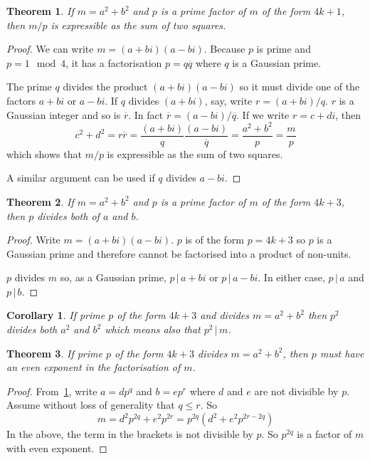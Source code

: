 \documentclass[11pt]{amsart}
\newtheorem{theorem}{Theorem}[section]
\newtheorem{corollary}{Corollary}[section]
\begin{document}
\vspace{1em}

\begin{theorem}
If $m = a^{2} + b^{2}$ and $p$ is a prime factor of $m$ of the form $4k+1$, then $m/p$ is expressible as the sum of two squares.
\end{theorem}

\begin{proof}
We can write $m = (a+b i) ( a - b i)$. Because $p$ is prime and $p = 1 \mod 4$, it has a factorisation $p = q \overline{q}$ 
where $q$ is a Gaussian prime.

The prime $q$ divides the product $(a+b i) ( a - b i)$ so it must divide one of the factors $a+bi$ or $a-bi$. If $q$ divides $(a+bi)$, say,  write $r = (a+bi) / q$. $r$ is a Gaussian integer and so is $\overline{r}$. In fact $\overline{r} = (a-bi) / \overline{q}$. If we write  $r = c + d i$, then 
$$
c^{2} + d^{2} = r \overline{r} = \frac{(a + b i)}{q} \frac{(a - b i)}{\overline{q}}= \frac{a^{2}+b^{2}}{p} = \frac{m}{p}
$$
which shows that $m/p$ is expressible as the sum of two squares.

A similar argument can be used if $q$ divides $a-bi$.
\end{proof}


\vspace{1em}

\begin{theorem}
If $m = a^{2} + b^{2}$ and $p$ is a prime factor of $m$ of the form $4k+3$, then $p$ divides both of $a$ and $b$.
\end{theorem}

\begin{proof}

Write $m = (a + b i) (a - b i)$. $p$ is of the form $p=4k+3$ so $p$ is a Gaussian prime and therefore cannot be factorised into a product of non-units.

 $p$ divides $m$ so, as a Gaussian prime, $p \, | \, a + b i$
or $p \, | \, a - b i$. In either case, $p \, | \, a $ and $p \, | \, b $.

\end{proof}

\vspace{1em}

\begin{corollary}
\label{cor:pSquaredDivM}
If prime $p$ of the form $4k+3$ and divides $m = a^{2} + b^{2}$ then $p^{2}$ divides both $a^{2}$ and $b^{2}$ which means also that $p^{2} \, | \, m$.
\end{corollary}

\begin{theorem}
If prime $p$ of the form $4k+3$ divides $m = a^{2} + b^{2}$, then $p$ must have an even exponent in the factorisation of $m$.
\end{theorem}

\begin{proof}
From~\cref{cor:pSquaredDivM}, write $a = d p^{q}$ and $b = e p^{r}$ where $d$ and $e$ are not divisible by $p$. Assume without loss of generality that $q \le r$.
So 
$$
m  = d^{2} p^{2q} + e^{2} p^{2r} = 
p^{2q} \left( d^{2} + e^{2} p^{2r-2q} \right)
$$
In the above, the term in the brackets is not divisible by $p$. So $p^{2q}$ is a factor of $m$ with even exponent.
\end{proof}
\end{document}
